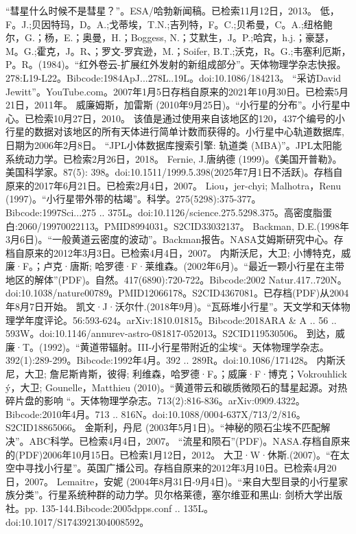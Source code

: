 \begin{enumerate}
 “彗星什么时候不是彗星？”。ESA/哈勃新闻稿。已检索11月12日，2013。
 低，F。J.;贝因特玛，D。A.;戈蒂埃，T.N.;吉列特，F。C.;贝希曼，C。A.;纽格鲍尔，G.；杨，E.；奥曼，H.；Boggess, N.；艾默生，J。P.;哈宾，h.j.；豪瑟，M。G.;霍克，J。R、；罗文-罗宾逊，M.；Soifer, B.T.;沃克，R。G.;韦塞利厄斯，P。R。(1984)。“红外卷云-扩展红外发射的新组成部分”。天体物理学杂志快报。278:L19-L22。Bibcode:1984ApJ...278L..19L。doi:10.1086/184213。
 “采访David Jewitt”。YouTube.com。2007年1月5日存档自原来的2021年10月30日。已检索5月21日，2011年。
 威廉姆斯，加雷斯 (2010年9月25日)。“小行星的分布”。小行星中心。已检索10月27日，2010。
 该值是通过使用来自该地区的120，437个编号的小行星的数据对该地区的所有天体进行简单计数而获得的。小行星中心轨道数据库,日期为2006年2月8日。
 “JPL小体数据库搜索引擎: 轨道类 (MBA)”。JPL太阳能系统动力学。已检索2月26日，2018。
 Fernie, J.唐纳德 (1999)。《美国开普勒》。美国科学家。87(5): 398。doi:10.1511/1999.5.398(2025年7月1日不活跃)。存档自原来的2017年6月21日。已检索2月4日，2007。
 Liou，jer-chyi; Malhotra，Renu (1997)。“小行星带外带的枯竭”。科学。275(5298):375-377。Bibcode:1997Sci...275 .. 375L。doi:10.1126/science.275.5298.375。高密度脂蛋白:2060/19970022113。PMID8994031。S2CID33032137。  
 Backman, D.E.(1998年3月6日)。“一般黄道云密度的波动”。Backman报告。NASA艾姆斯研究中心。存档自原来的2012年3月3日。已检索4月4日，2007。
 内斯沃尼，大卫; 小博特克，威廉·F。；卢克·唐斯; 哈罗德·F·莱维森。(2002年6月)。“最近一颗小行星在主带地区的解体”(PDF)。自然。417(6890):720-722。Bibcode:2002 Natur.417..720N。doi:10.1038/nature00789。PMID12066178。S2CID4367081。已存档(PDF)从2004年8月7日开始。   
 凯文·J·沃尔什.(2018年9月)。“瓦砾堆小行星”。天文学和天体物理学年度评论。56:593-624。arXiv:1810.01815。Bibcode:2018ARA & A .. 56 .. 593W。doi:10.1146/annurev-astro-081817-052013。S2CID119530506。 
 到达，威廉·T。(1992)。“黄道带辐射。III-小行星带附近的尘埃“。天体物理学杂志。392(1):289-299。Bibcode:1992年4月。392 .. 289R。doi:10.1086/171428。
 内斯沃尼，大卫; 詹尼斯肯斯，彼得; 利维森，哈罗德·F。；威廉·F·博克；Vokrouhlick ý，大卫; Gounelle，Matthieu (2010)。“黄道带云和碳质微陨石的彗星起源。对热碎片盘的影响 “。天体物理学杂志。713(2):816-836。arXiv:0909.4322。Bibcode:2010年4月。713 .. 816N。doi:10.1088/0004-637X/713/2/816。S2CID18865066。 
 金斯利，丹尼 (2003年5月1日)。“神秘的陨石尘埃不匹配解决”。ABC科学。已检索4月4日，2007。
 “流星和陨石”(PDF)。NASA.存档自原来的(PDF)2006年10月15日。已检索1月12日，2012。
 大卫·W·休斯.(2007)。“在太空中寻找小行星”。英国广播公司。存档自原来的2012年3月10日。已检索4月20日，2007。
 Lemaitre，安妮 (2004年8月31日-9月4日)。“来自大型目录的小行星家族分类”。行星系统种群的动力学。贝尔格莱德，塞尔维亚和黑山: 剑桥大学出版社。pp. 135-144.Bibcode:2005dpps.conf .. 135L。doi:10.1017/S1743921304008592。

\end{enumerate}
